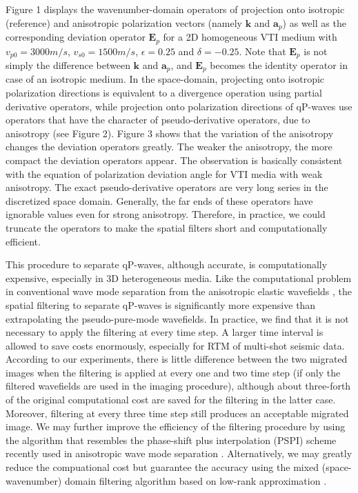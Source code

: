 Figure 1 displays the wavenumber-domain operators of projection onto isotropic (reference) and anisotropic polarization vectors 
(namely $\mathbf{k}$ and $\mathbf{a}_{p}$)
as well as the corresponding deviation operator $\mathbf{E}_{p}$
for a 2D homogeneous VTI medium with $v_{p0}=3000m/s$, $v_{s0}=1500m/s$, $\epsilon=0.25$ 
and $\delta=-0.25$. Note that $\mathbf{E}_{p}$ is not simply the difference between
 $\mathbf{k}$ and $\mathbf{a}_{p}$,
and $\mathbf{E}_{p}$ becomes the identity operator in case of an isotropic medium.
In the space-domain, projecting onto isotropic polarization directions
is equivalent to a divergence operation using partial derivative operators, 
while projection onto polarization directions of qP-waves use operators that have 
the character of pseudo-derivative operators, due to anisotropy (see Figure 2).
Figure 3 shows that the variation of the anisotropy changes the deviation operators greatly.
 The weaker the anisotropy, the more compact the deviation operators appear. The observation is 
basically consistent with the equation of polarization deviation angle for VTI media with weak anisotropy.
 The exact pseudo-derivative operators are very long series in 
the discretized space domain. Generally, the far ends of these operators have 
ignorable values even for strong anisotropy. Therefore, in practice, we could truncate the operators
 to make the spatial filters short and computationally efficient.

This procedure to separate qP-waves, although accurate, is computationally expensive,
 especially in 3D heterogeneous media. Like the computational problem in conventional wave mode separation
 from the anisotropic elastic wavefields \cite[]{yan.sava:2009,yan:2012}, the spatial filtering to separate 
qP-waves is significantly more expensive than extrapolating the pseudo-pure-mode wavefields.
In practice, we find that it is not necessary to apply the filtering at every time step.
 A larger time interval is allowed 
to save costs enormously, especially for RTM of multi-shot seismic data. 
According to our experiments, there is little difference between the two migrated images when the filtering is applied
at every one and two time step (if only the filtered wavefields are used in the imaging procedure), 
although about three-forth of the original computational cost
are saved for the filtering in the latter case.
Moreover, filtering at every three time step still produces an acceptable migrated image.
We may further improve the efficiency of the filtering procedure
by using the algorithm that resembles the phase-shift plus interpolation (PSPI) scheme recently used in
anisotropic wave mode separation \cite[]{yan.sava:2011}.
Alternatively, we may greatly reduce the compuational cost but guarantee the accuracy 
using the mixed (space-wavenumber) domain filtering algorithm 
based on low-rank approximation \cite[]{cheng.fomel:2013}.

